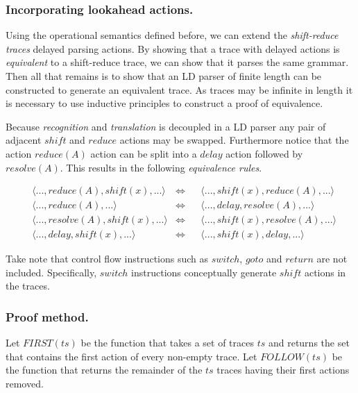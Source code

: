 \documentclass[envcountsame,runningheads]{llncs}
\begin{document}
\subsubsection{Incorporating lookahead actions.}

Using the operational semantics defined before, we can extend the \emph{shift-reduce traces} delayed parsing actions.
By showing that a trace with delayed actions is \emph{equivalent} to a shift-reduce trace, we can show that it parses the same grammar.
Then all that remains is to show that an LD parser of finite length can be constructed to generate an equivalent trace.
As traces may be infinite in length it is necessary to use inductive principles to construct a proof of equivalence.

Because \emph{recognition} and \emph{translation} is decoupled in a LD parser any pair of adjacent $shi\!ft$ and $reduce$ actions may be swapped.
Furthermore notice that the action $reduce(A)$ action can be split into a $delay$ action followed by $resolve(A)$.
This results in the following \emph{equivalence rules}.

\begin{align*}
&\langle ..., reduce(A), shi\!ft(x), ... \rangle  &\iff&& \langle ..., shi\!ft(x), reduce(A), ... \rangle  \tag{eq-1}\\
&\langle ..., reduce(A), ... \rangle              &\iff&& \langle ..., delay, resolve(A), ... \rangle      \tag{eq-2}\\
&\langle ..., resolve(A), shi\!ft(x), ... \rangle &\iff&& \langle ..., shi\!ft(x), resolve(A), ... \rangle \tag{eq-3}\\
&\langle ..., delay, shi\!ft(x), ... \rangle      &\iff&& \langle ..., shi\!ft(x), delay, ... \rangle      \tag{eq-4}
\end{align*}

Take note that control flow instructions such as $switch$, $goto$ and $return$ are not included.
Specifically, $switch$ instructions conceptually generate $shi\!ft$ actions in the traces.

\subsubsection{Proof method.}

Let $F\!I\!RST(ts)$ be the function that takes a set of traces $ts$ and returns the set that contains the first action of every non-empty trace.
Let $FOLLOW(ts)$ be the function that returns the remainder of the $ts$ traces having their first actions removed.
\end{document}
